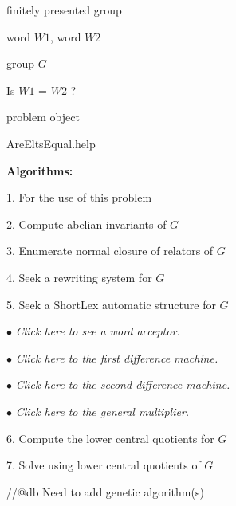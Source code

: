\documentclass[12pt]{article}
\begin{document}
  		finitely presented group 

  	word $W1$, word $W2$ 

  	group $G$

  	Is $W1$ = $W2$ ?

  		problem object

  		AreEltsEqual.help


\vspace{5 mm}\begin{center} \Large\textbf{Algorithms:} \end{center}


1. For the use of this problem

2. Compute abelian invariants of $G$

3. Enumerate normal closure of relators of $G$

4. Seek a rewriting system for $G$

5. Seek a ShortLex automatic structure for $G$


\hspace{11mm}$\bullet$ {\em Click here to see a word acceptor.}

\hspace{11mm}$\bullet$ {\em Click here to the first difference machine.}

\hspace{11mm}$\bullet$ {\em Click here to the second difference machine.}

\hspace{11mm}$\bullet$ {\em Click here to the general multiplier.}

6. Compute the lower central quotients for $G$

7. Solve using lower central quotients of $G$

//@db Need to add genetic algorithm(s)  
\end{document}

